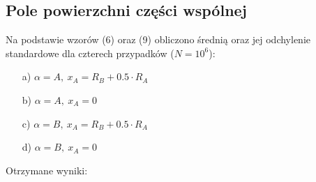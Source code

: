 \documentclass[a4paper,12pt,twoside]{article}
\begin{document}
\subsection{Pole powierzchni części wspólnej}
Na podstawie wzorów (6) oraz (9) obliczono średnią oraz jej odchylenie standardowe dla czterech przypadków ($N = 10^6$):

\begin{enumerate}
  \item[a)] $\alpha = A,\ x_A = R_B + 0.5 \cdot R_A$
  \item[b)] $\alpha = A,\ x_A = 0$
  \item[c)] $\alpha = B,\ x_A = R_B + 0.5 \cdot R_A$
  \item[d)] $\alpha = B,\ x_A = 0$
\end{enumerate}
\newpage
Otrzymane wyniki:
\end{document}
